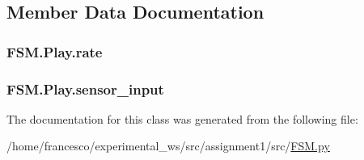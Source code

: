 \subsection{Member Data Documentation}
\subsubsection[{\texorpdfstring{rate}{rate}}]{\setlength{\rightskip}{0pt plus 5cm}F\+S\+M.\+Play.\+rate}\hypertarget{classFSM_1_1Play_a21dea0882a6b4f29db67e50234b0f168}{}\label{classFSM_1_1Play_a21dea0882a6b4f29db67e50234b0f168}
\subsubsection[{\texorpdfstring{sensor\+\_\+input}{sensor_input}}]{\setlength{\rightskip}{0pt plus 5cm}F\+S\+M.\+Play.\+sensor\+\_\+input}\hypertarget{classFSM_1_1Play_a8aea6272cf59d81e990b67d6b62c84ac}{}\label{classFSM_1_1Play_a8aea6272cf59d81e990b67d6b62c84ac}


The documentation for this class was generated from the following file\+:\begin{DoxyCompactItemize}
\item 
/home/francesco/experimental\+\_\+ws/src/assignment1/src/\hyperlink{FSM_8py}{F\+S\+M.\+py}\end{DoxyCompactItemize}
